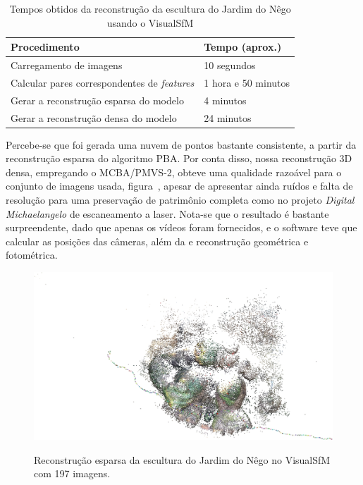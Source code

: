 \begin{table}[h!]
\caption{Tempos obtidos da reconstrução da escultura do Jardim do Nêgo usando o VisualSfM}
\label{tab:temposSfMJardimDoNego}
\begin{tabular}{|l|p{4.7cm}|}
\hline
Procedimento & Tempo (aprox.) \\ \hline
Carregamento de imagens & 10 segundos \\ \hline
Calcular pares correspondentes de \emph{features} & 1 hora e 50 minutos \\ \hline
Gerar a reconstrução esparsa do modelo & 4 minutos \\ \hline
Gerar a reconstrução densa do modelo & 24 minutos \\ \hline
\end{tabular}
\end{table}

Percebe-se que foi gerada uma nuvem de pontos bastante consistente, a partir da
reconstrução esparsa do algoritmo PBA.  Por conta disso, nossa reconstrução 3D
densa, empregando o MCBA/PMVS-2, obteve uma qualidade razoável para o conjunto de
imagens usada, figura~\cite{fig:reconstrucaoEsparsaIndioVisualSFM}, apesar de apresentar ainda ruídos e falta de resolução para uma
preservação de patrimônio completa como no projeto \emph{Digital Michaelangelo}
de escaneamento a laser. Nota-se que o resultado é bastante surpreendente, dado que
apenas os vídeos foram fornecidos, e o software teve que calcular as posições
das câmeras, além da e reconstrução geométrica e fotométrica.

\newpage

\begin{figure}[!h]
	\centering
	\caption{%
	Reconstrução esparsa da escultura do Jardim do Nêgo no VisualSfM com 197 imagens.
	}
	\includegraphics[width=0.9\linewidth]{figs/guerreiroEsparsa.jpg}
		\label{fig:reconstrucaoEsparsaIndioVisualSFM}
\end{figure}

